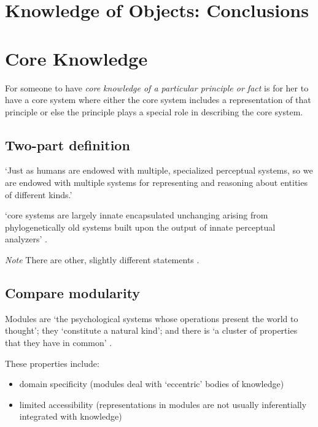 \documentclass[12pt]{extarticle}
\begin{document}
\begin{multicols}{3}
 
 
\section{Knowledge of Objects: Conclusions}
 
 
 
\section{Core Knowledge}
 
For someone to have \textit{core knowledge of a particular principle or fact} is for her to have a core system where 
either the core system includes a representation of that principle or else the principle plays a special role in describing the core system.
 
\subsection{Two-part definition}
 
‘Just as humans are endowed with multiple, specialized perceptual systems, so we are endowed with multiple systems for representing and reasoning about entities of different kinds.’
\citep[p.\ 517]{Carey:1996hl}
 
‘core systems are 
largely innate 
encapsulated 
unchanging 
arising from phylogenetically old systems 
built upon the output of innate perceptual analyzers’ 
\citep[p.\ 520]{Carey:1996hl}.
 
\textit{Note} There are other, slightly different statements \citep[e.g.][]{carey:2009_origin}.
 
\subsection{Compare modularity}
 
Modules are ‘the psychological systems whose operations present the world to thought’; 
they ‘constitute a natural kind’; and 
there is ‘a cluster of properties that they have in common’ \citep[p.\ 101]{Fodor:1983dg}.
 
These properties include:
 
\begin{itemize}
 
\item domain specificity (modules deal with ‘eccentric’ bodies of knowledge)
 
\item limited accessibility (representations in modules are not usually inferentially integrated with knowledge)
 

\end{itemize}
\end{multicols}
\end{document}
